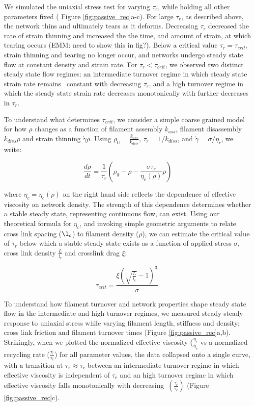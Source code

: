 \documentclass[10pt,letterpaper]{article}
\begin{document}
We simulated the uniaxial stress test for varying $\tau_r$, while holding all other parameters fixed ( Figure \ref{fig:passive_rec}a-c). For large $\tau_r$, as described above, the network thins and ultimately tears as it deforms.  Decreasing $\tau_r$ decreased the rate of strain thinning and increased the the time, and amount of strain, at which tearing occurs  (EMM: need to show this in fig?). Below a critical value $\tau_r = \tau_{crit}$, strain thinning and tearing no longer occur, and networks undergo steady state flow at constant density and strain rate.  For $\tau_r < \tau_{crit}$, we observed two distinct steady state flow regimes: an intermediate turnover regime in which steady state strain rate remains ~constant with decreasing $\tau_r$, and a high turnover regime in which the steady state strain rate decreases monotonically with further decreases in $\tau_r$.

To understand what determines $\tau_{crit}$, we consider a simple coarse grained model for how $\rho$ changes as a function of filament assembly $k_{ass}$, filament disassembly $k_{diss}\rho$ and strain thinning $\dot{\gamma}\rho$.  Using $\rho_0 = \frac {k_{ass}}{k_{diss}}$,  $\tau_r = 1/k_{diss}$, and $\dot{\gamma} = \sigma/\eta_c$, we write:

\begin{equation}
\frac{d \rho}{dt} = \frac{1}{\tau_r} \left (\rho_0  - \rho - \frac{\sigma \tau_r}{\eta_c(\rho)} \rho \right )
\end{equation}

where $\eta_c = \eta_c(\rho)$ on the right hand side reflects the dependence of effective viscosity on network density. The strength of this dependence determines whether a stable steady state, representing continuous flow, can exist.  Using our theoretical formula for  $\eta_c$, and invoking simple geometric arguments to relate cross link spacing ($\l_c$) to filament density ($\rho$), we can estimate the critical value of $\tau_r$ below which a stable steady state exists as a function of applied stress $\sigma$, cross link density $\frac{L}{l_c}$ and crosslink drag $\xi$:   

\begin{equation}
\label{eqn:syst3}
\tau_{crit} = \frac{\xi {\left (\sqrt{\frac{L}{l_c}}-1 \right )}^3}{\sigma}.
\end{equation}

 To understand how filament turnover and network properties shape steady state flow in the intermediate and high turnover regimes, we measured steady steady response to uniaxial stress while varying filament length, stiffness and density; cross link friction and filament turnover times (Figure \ref{fig:passive_rec}a,b). Strikingly, when we plotted the normalized effective viscosity ($\frac{\eta_r}{\eta_c}$ vs a normalized recycling rate ($\frac{\tau_r}{\tau_c}$) for all parameter values, the data collapsed onto a single curve, with a transition at  $\tau_r \approx \tau_c$  between an intermediate turnover regime in which effective viscosity is independent of $\tau_r$  and an high turnover regime in which effective viscosity falls monotonically with decreasing $~\left (\frac{\tau_r}{\tau_c}\right)$  (Figure \ref{fig:passive_rec}c). 
 
\end{document}
